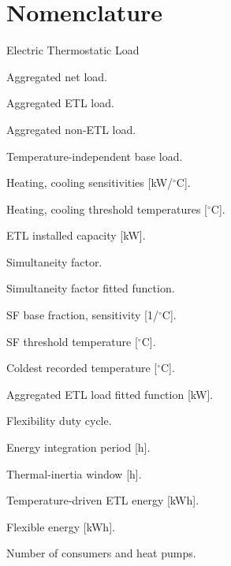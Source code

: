 \documentclass[9pt,journal,a4]{IEEEtran}
\begin{document}
\section*{Nomenclature}
\begin{IEEEdescription}
\item [ETL] Electric Thermostatic Load
\item[$P_{\mathrm{net}}(t)$] Aggregated net load.
\item[$P_{\mathrm{ETL}}(t)$] Aggregated ETL load.
\item[$P_{\text{non-ETL}}(t)$] Aggregated non-ETL load.
\item[$P_{\mathrm{base}}$] Temperature-independent base load.
\item[$s_h,\ s_c$] Heating, cooling sensitivities [kW/$^\circ$C].
\item[$T_h,\ T_c$] Heating, cooling threshold temperatures [$^\circ$C].
\item[$P_{\mathrm{ETL}}^{\max}$] ETL installed capacity [kW].
\item[$\mathrm{SF}(T)$] Simultaneity factor.
\item[$\hat{\mathrm{SF}}(T)$] Simultaneity factor fitted function.
\item[$b,\ m$] SF base fraction, sensitivity [1/$^\circ$C].
\item[$T_h^{\mathrm{SF}}$] SF threshold temperature [$^\circ$C].
\item[$T_{\min}$] Coldest recorded temperature [$^\circ$C].
\item[$\hat{P}_{\mathrm{ETL}}^{\,i}(T)$] Aggregated ETL load fitted function [kW].
\item[$\alpha_F$] Flexibility duty cycle.
\item[$\Delta t$] Energy integration period [h].
\item[$\Delta t_{Th}$] Thermal-inertia window [h].
\item[$E_{\mathrm{ETL}}$] Temperature-driven ETL energy [kWh].
\item[$E_{\mathrm{flex}}$] Flexible energy [kWh].
\item[$N,\ N_{hp}$] Number of consumers and heat pumps.
\end{IEEEdescription}

\end{document}
